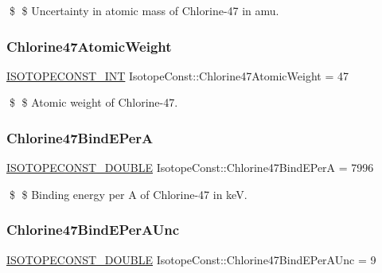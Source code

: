 \$ \$ Uncertainty in atomic mass of Chlorine-\/47 in amu. \mbox{\label{group___isotope_const-_chlorine-_cl47_ga8879f472bd3e46d38fca6c4eaa67e1d0}} 
\subsubsection{\texorpdfstring{Chlorine47\+Atomic\+Weight}{Chlorine47AtomicWeight}}
{\footnotesize\ttfamily \mbox{\hyperlink{group___isotope_const-_macros_ga5f18360b3e99483a35c32d789e62621c}{I\+S\+O\+T\+O\+P\+E\+C\+O\+N\+S\+T\+\_\+\+I\+NT}} Isotope\+Const\+::\+Chlorine47\+Atomic\+Weight = 47}

\$ \$ Atomic weight of Chlorine-\/47. \mbox{\label{group___isotope_const-_chlorine-_cl47_ga03cfa047100a190be14eb75718eb421d}} 
\subsubsection{\texorpdfstring{Chlorine47\+Bind\+E\+PerA}{Chlorine47BindEPerA}}
{\footnotesize\ttfamily \mbox{\hyperlink{group___isotope_const-_macros_ga8f45a7272ce02c0b4c65c44636ed719a}{I\+S\+O\+T\+O\+P\+E\+C\+O\+N\+S\+T\+\_\+\+D\+O\+U\+B\+LE}} Isotope\+Const\+::\+Chlorine47\+Bind\+E\+PerA = 7996}

\$ \$ Binding energy per A of Chlorine-\/47 in keV. \mbox{\label{group___isotope_const-_chlorine-_cl47_ga7e409a45cde355e46f72312b1a5f678c}} 
\subsubsection{\texorpdfstring{Chlorine47\+Bind\+E\+Per\+A\+Unc}{Chlorine47BindEPerAUnc}}
{\footnotesize\ttfamily \mbox{\hyperlink{group___isotope_const-_macros_ga8f45a7272ce02c0b4c65c44636ed719a}{I\+S\+O\+T\+O\+P\+E\+C\+O\+N\+S\+T\+\_\+\+D\+O\+U\+B\+LE}} Isotope\+Const\+::\+Chlorine47\+Bind\+E\+Per\+A\+Unc = 9}

